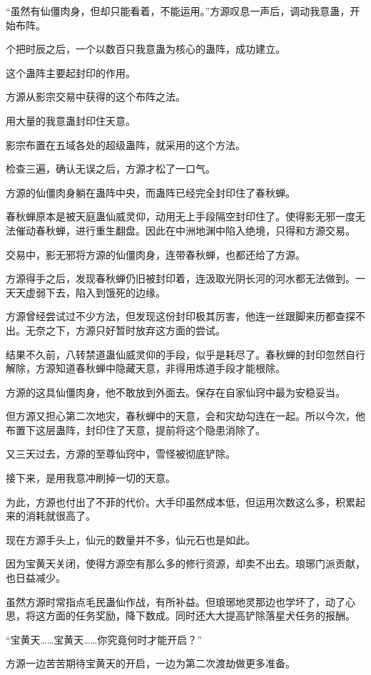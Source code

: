 \begin{this_body}
“虽然有仙僵肉身，但却只能看着，不能运用。”方源叹息一声后，调动我意蛊，开始布阵。

个把时辰之后，一个以数百只我意蛊为核心的蛊阵，成功建立。

这个蛊阵主要起封印的作用。

方源从影宗交易中获得的这个布阵之法。

用大量的我意蛊封印住天意。

影宗布置在五域各处的超级蛊阵，就采用的这个方法。

检查三遍，确认无误之后，方源才松了一口气。

方源的仙僵肉身躺在蛊阵中央，而蛊阵已经完全封印住了春秋蝉。

春秋蝉原本是被天庭蛊仙威灵仰，动用无上手段隔空封印住了。使得影无邪一度无法催动春秋蝉，进行重生翻盘。因此在中洲地渊中陷入绝境，只得和方源交易。

交易中，影无邪将方源的仙僵肉身，连带春秋蝉，也都还给了方源。

方源得手之后，发现春秋蝉仍旧被封印着，连汲取光阴长河的河水都无法做到。一天天虚弱下去，陷入到饿死的边缘。

方源曾经尝试过不少方法，但发现这份封印极其厉害，他连一丝跟脚来历都查探不出。无奈之下，方源只好暂时放弃这方面的尝试。

结果不久前，八转禁道蛊仙威灵仰的手段，似乎是耗尽了。春秋蝉的封印忽然自行解除，方源知道春秋蝉中隐藏天意，非得用炼道手段才能根除。

方源的这具仙僵肉身，他不敢放到外面去。保存在自家仙窍中最为安稳妥当。

但方源又担心第二次地灾，春秋蝉中的天意，会和灾劫勾连在一起。所以今次，他布置下这层蛊阵，封印住了天意，提前将这个隐患消除了。

又三天过去，方源的至尊仙窍中，雪怪被彻底铲除。

接下来，是用我意冲刷掉一切的天意。

为此，方源也付出了不菲的代价。大手印虽然成本低，但运用次数这么多，积累起来的消耗就很高了。

现在方源手头上，仙元的数量并不多，仙元石也是如此。

因为宝黄天关闭，使得方源空有那么多的修行资源，却卖不出去。琅琊门派贡献，也日益减少。

虽然方源时常指点毛民蛊仙作战，有所补益。但琅琊地灵那边也学坏了，动了心思，将这方面的任务奖励，降下数成。同时还大大提高铲除落星犬任务的报酬。

“宝黄天……宝黄天……你究竟何时才能开启？”

方源一边苦苦期待宝黄天的开启，一边为第二次渡劫做更多准备。


\end{this_body}

